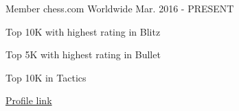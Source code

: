 

\begin{cventries}

  \cventry
    {Member} %
    {chess.com} %
    {Worldwide} %
    {Mar. 2016 - PRESENT} %
    {
      \begin{cvitems} %
        \item {Top 10K with highest rating in Blitz}
        \item {Top 5K with highest rating in Bullet}
        \item {Top 10K in Tactics}
        \item {\href{https://www.chess.com/member/bluella}{Profile link}}
      \end{cvitems}
    }

\end{cventries}
